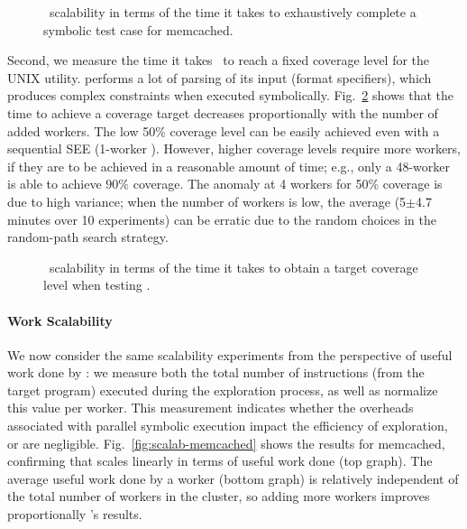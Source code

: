 \begin{figure}[h!]
  \centering
  \caption{\cnine\ scalability in terms of the time it takes to exhaustively complete a symbolic test case for memcached.}
  \label{fig:scalab-time-vs-workers}
\end{figure}

Second, we measure the time it takes \cnine\ to reach a fixed coverage level for the  UNIX utility.   performs a lot of parsing of its input (format specifiers), which produces complex constraints when executed symbolically.   Fig.~\ref{fig:scalab-time-vs-workers-cov} shows that the time to achieve a coverage target decreases proportionally with the number of added workers.  The low 50\% coverage level can be easily achieved even with a sequential SEE (1-worker \cnine). However, higher coverage levels require more workers, if they are to be achieved in a reasonable amount of time; e.g., only a 48-worker \cnine is able to achieve  $90\%$ coverage.  The anomaly at 4 workers for 50\% coverage is due to high variance; when the number of workers is low, the average (5$\pm$4.7 minutes over 10 experiments) can be erratic due to the random choices in the random-path search strategy.

\begin{figure}[h!]
  \centering
  \caption{\cnine\ scalability in terms of the time it takes to obtain a target coverage level when testing .}
  \label{fig:scalab-time-vs-workers-cov}
\end{figure}

\paragraph{Work Scalability} We now consider the same scalability experiments from the perspective of useful work done by \cnine: we measure both the total number of instructions (from the target program) executed during the exploration process, as well as normalize this value per worker. This measurement indicates whether the overheads associated with parallel symbolic execution impact the efficiency of exploration, or are negligible. Fig.~\ref{fig:scalab-memcached} shows the results for memcached, confirming that \cnine scales linearly in terms of useful work done (top graph).  The average useful work done by a worker (bottom graph) is relatively independent of the total number of workers in the cluster, so adding more workers improves proportionally \cnine's results.

